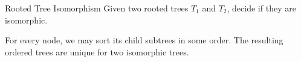 \documentclass[handout]{beamer}
\begin{document}
\begin{frame}{Rooted Tree Isomorphism}
	Given two rooted trees $T_1$ and $T_2$, decide if they are isomorphic.
	
	\pause
	\begin{solution}
		For every node, we may sort its child subtrees in some order. The resulting ordered trees are unique for two isomorphic trees.
	\end{solution}
    \pause
    
    \begin{figure}
    	\centering
    
\end{figure}
\end{frame}
\end{document}
